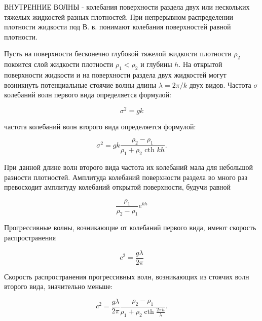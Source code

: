 \documentclass[10pt]{article}
\begin{document}
ВНУТРЕННИЕ ВОЛНЫ - колебания поверхности раздела двух или нескольких тяжелых жидкостей разных плотностей. При непрерывном распределении плотности жидкости под В. в. понимают колебания поверхностей равной плотности.



Пусть на поверхности бесконечно глубокой тяжелой жидкости плотности $\rho_{2}$ покоится слой жидкости плотности $\rho_{1}<\rho_{2}$ и глубины $h$. На открытой поверхности жидкости и на поверхности раздела двух жидкостей могут возникнуть потенциальные стоячие волны длины $\lambda=2 \pi / k$ двух видов. Частота $\sigma$ колебаний волн первого вида определяется формулой:



\[

\sigma^{2}=g k

\]



частота колебаний волн второго вида определяется формулой:



\[

\sigma^{2}=g k \frac{\rho_{2}-\rho_{1}}{\rho_{1}+\rho_{2} \text { cth } k h} .

\]



При данной длине волн второго вида частота их колебаний мала для небольшой разности плотностей. Амплитуда колебаний поверхности раздела во много раз превосходит амплитуду колебаний открытой поверхности, будучи равной



\[

\frac{\rho_{1}}{\rho_{2}-\rho_{1}} e^{k h}

\]



Прогрессивные волны, возникающие от колебаний первого вида, имеют скорость распространения



\[

c^{2}=\frac{g \lambda}{2 \pi}

\]



Скорость распространения прогрессивных волн, возникающих из стоячих волн второго вида, значительно меньше:



\[

c^{2}=\frac{g \lambda}{2 \pi} \frac{\rho_{2}-\rho_{1}}{\rho_{1}+\rho_{2} \operatorname{cth} \frac{2 \pi h}{\lambda}} .

\]
\end{document}
